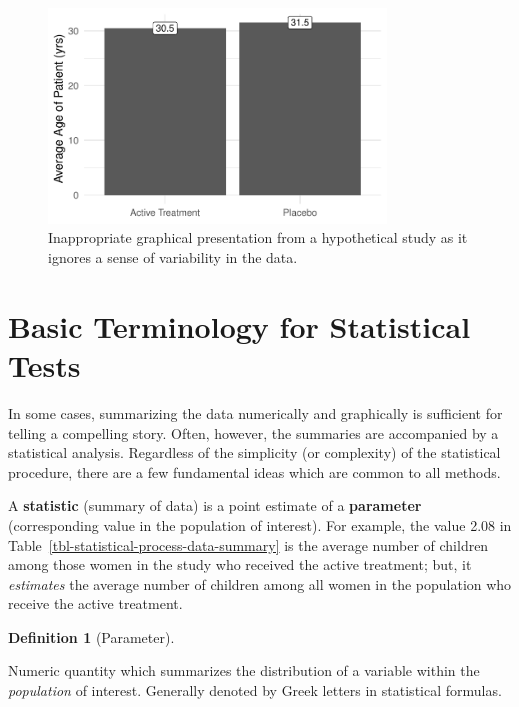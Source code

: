 \documentclass[
  letterpaper,
  DIV=11,
  numbers=noendperiod]{scrreprt}
\theoremstyle{definition}
\newtheorem{definition}{Definition}[chapter]
\theoremstyle{definition}
\theoremstyle{remark}
\begin{document}
\begin{figure}

{\centering \includegraphics[width=0.8\textwidth,height=\textheight]{./images/fig-statistical-process-poor-graphics-1.pdf}

}

\caption{\label{fig-statistical-process-poor-graphics}Inappropriate
graphical presentation from a hypothetical study as it ignores a sense
of variability in the data.}

\end{figure}

\hypertarget{basic-terminology-for-statistical-tests}{%
\section{Basic Terminology for Statistical
Tests}\label{basic-terminology-for-statistical-tests}}

In some cases, summarizing the data numerically and graphically is
sufficient for telling a compelling story. Often, however, the summaries
are accompanied by a statistical analysis. Regardless of the simplicity
(or complexity) of the statistical procedure, there are a few
fundamental ideas which are common to all methods.

A \textbf{statistic} (summary of data) is a point estimate of a
\textbf{parameter} (corresponding value in the population of interest).
For example, the value 2.08 in
Table~\ref{tbl-statistical-process-data-summary} is the average number
of children among those women in the study who received the active
treatment; but, it \emph{estimates} the average number of children among
all women in the population who receive the active treatment.

\begin{definition}[Parameter]\protect\hypertarget{def-parameter}{}\label{def-parameter}

Numeric quantity which summarizes the distribution of a variable within
the \emph{population} of interest. Generally denoted by Greek letters in
statistical formulas.

\end{definition}
\end{document}
